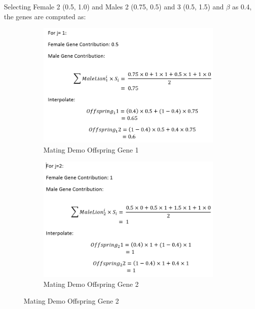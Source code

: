 Selecting Female 2 (0.5, 1.0) and Males 2 (0.75, 0.5) and 3 (0.5, 1.5) and $\beta$ as 0.4, the genes are computed as:

\begin{figure}[H]
  \begin{center}
  \begin{subfigure}[b]{0.45\textwidth}
  \begin{center}
    \includegraphics[width=1.2\textwidth]{img/mating/matingdemooff1}
    \caption{Mating Demo Offspring Gene 1}
  \end{center}
  \end{subfigure}
  \begin{subfigure}[b]{0.45\textwidth}
  \begin{center}
    \includegraphics[width=1.2\textwidth]{img/mating/matingdemooff2}
    \caption{Mating Demo Offspring Gene 2}
  \end{center}
  \end{subfigure}
  \end{center}
\end{figure}

